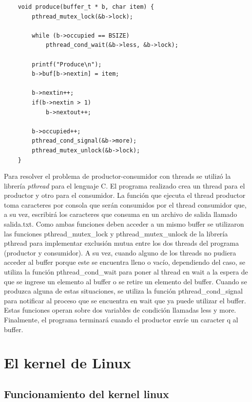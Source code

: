 \documentclass[a4paper,11pt] {article}
\begin{document}
\begin{enumerate}
\begin{verbatim}
	void produce(buffer_t * b, char item) {
		pthread_mutex_lock(&b->lock);
		
		while (b->occupied == BSIZE)
			pthread_cond_wait(&b->less, &b->lock);
	
		printf("Produce\n");
		b->buf[b->nextin] = item;
		
		b->nextin++;
		if(b->nextin > 1)
			b->nextout++;
	
		b->occupied++;
		pthread_cond_signal(&b->more);
		pthread_mutex_unlock(&b->lock);
	}
	\end{verbatim}

	Para resolver el problema de productor-consumidor con threads se utilizó la librería \textit{pthread} para el lenguaje C.
	El programa realizado crea un thread para el productor y otro para el consumidor. La función que ejecuta el thread productor toma caracteres por consola que serán consumidos por el thread consumidor que, a su vez, escribirá los caracteres que consuma en un archivo de salida llamado salida.txt. Como ambas funciones deben acceder a un mismo buffer se utilizaron las funciones pthread\_mutex\_lock y pthread\_mutex\_unlock de la librería pthread para implementar exclusión mutua entre los dos threads del programa (productor y consumidor). A su vez, cuando alguno de los threads no pudiera acceder al buffer porque este se encuentra lleno o vacío, dependiendo del caso, se utiliza la función pthread\_cond\_wait para poner al thread en wait a la espera de que se ingrese un elemento al buffer o se retire un elemento del buffer. Cuando se produzca alguna de estas situaciones, se utiliza la función pthread\_cond\_signal para notificar al proceso que se encuentra en wait que ya puede utilizar el buffer. Estas funciones operan sobre dos variables de condición llamadas less y more. Finalmente, el programa terminará cuando el productor envíe un caracter q al buffer.

\end{enumerate}

\section*{El kernel de Linux}

\subsection*{Funcionamiento del kernel linux}
\end{document}
